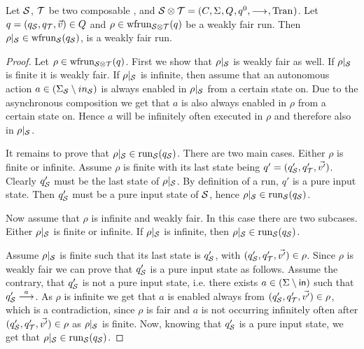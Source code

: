 \begin{lemma}\label{lem:projection-run}
    Let $\S$, $\T$ be two composable \AIOTSs, and $\S\compos\T = \aiotstup{}$. Let $q = (q_\S,q_\T,\vec{v}) \in Q$ and $\rho \in \frun{\S\compos\T}(q)$ be a weakly fair run. Then $\rho|_\S \in \frun{\S}(q_\S)$, is a weakly fair run.
\end{lemma}
\begin{proof}
	Let $\rho \in \frun{\S\compos\T}(q)$. First we show that $\rho|_\S$ is weakly fair as well. If $\rho|_\S$ is finite it is weakly fair. 
If $\rho|_\S$ is infinite, then assume that an autonomous action $a \in (\Sigma_\S \setminus in_\S)$ is always enabled in $\rho|_\S$ from a certain state on. Due to the asynchronous composition
we get that $a$ is also always enabled in $\rho$ from a certain state on. Hence $a$ will be infinitely often executed in $\rho$ and therefore also in $\rho|_\S$.

 It remains to prove that $\rho|_\S \in \run{\S}(q_\S)$. 
    There are two main cases. Either $\rho$ is finite or infinite. 
    Assume $\rho$ is finite with its last state being $q' = (q'_\S,q'_\T,\vec{v'})$. Clearly $q'_\S$ must be the last state of $\rho|_\S$. By definition of a run, $q'$ is a pure input state. Then $q'_\S$ must be a pure input state of $\S$, hence $\rho|_\S \in \run{\S}(q_\S)$.
    
    Now assume that $\rho$ is infinite and weakly fair. In this case there are two subcases. Either $\rho|_\S$ is finite or infinite. If $\rho|_\S$ is infinite, then $\rho|_\S \in \run{\S}(q_\S)$.

    Assume $\rho|_\S$ is finite such that its last state is $q'_\S$, with $(q'_\S,q'_\T,\vec{v'}) \in \rho$. Since $\rho$ is weakly fair we can prove that $q'_\S$ is a pure input state as follows. Assume the contrary, that $q'_\S$ is not a pure input state, i.e. there exists $a \in (\Sigma \setminus \inset)$ such that $q'_\S \goes{a}$. As $\rho$ is infinite we get that $a$ is enabled always from $(q'_\S,q'_\T,\vec{v'}) \in \rho$, which is a contradiction, since $\rho$ is fair and $a$ is not occurring infinitely often after $(q'_\S,q'_\T,\vec{v'}) \in \rho$ as $\rho|_\S$ is finite. Now, knowing that $q'_\S$ is a pure input state, we get that $\rho|_\S \in \run{\S}(q_\S)$.
\end{proof}

